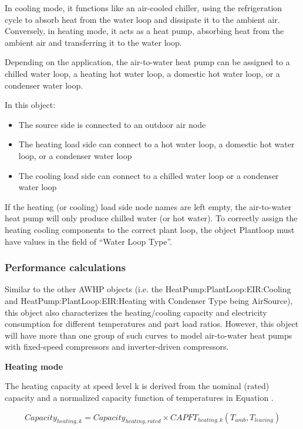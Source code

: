 In cooling mode, it functions like an air-cooled chiller, using the
refrigeration cycle to absorb heat from the water loop and dissipate it to the
ambient air. Conversely, in heating mode, it acts as a heat pump, absorbing heat
from the ambient air and transferring it to the water loop.

Depending on the application, the air-to-water heat pump can be assigned to a
chilled water loop, a heating hot water loop, a domestic hot water loop, or a
condenser water loop.

In this object:
\begin{itemize}
\item The source side is connected to an outdoor air node
\item The heating load side can connect to a hot water loop, a domestic hot water loop, or a condenser water loop
\item The cooling load side can connect to a chilled water loop or a condenser water loop
\end{itemize}

If the heating (or cooling) load side node names are left empty, the
air-to-water heat pump will only produce chilled water (or hot water). To
correctly assign the heating cooling components to the correct plant loop, the
object Plantloop must have values in the field of ``Water Loop Type''.

\subsubsection{Performance calculations}

Similar to the other AWHP objects (i.e. the HeatPump:PlantLoop:EIR:Cooling and
HeatPump:PlantLoop:EIR:Heating with Condenser Type being AirSource), this object
also characterizes the heating/cooling capacity and electricity consumption for
different temperatures and part load ratios. However, this object will have more
than one group of such curves to model air-to-water heat pumps with fixed-speed
compressors and inverter-driven compressors.

\noindent\textbf{Heating mode}

The heating capacity at speed level k is derived from the nominal (rated)
capacity and a normalized capacity function of temperatures in Equation .

\begin{equation}
Capacity_{heating,k}=Capacity_{heating,rated} \times CAPFT_{heating,k}(T_{amb},T_{leaving})	                 
\end{equation}

